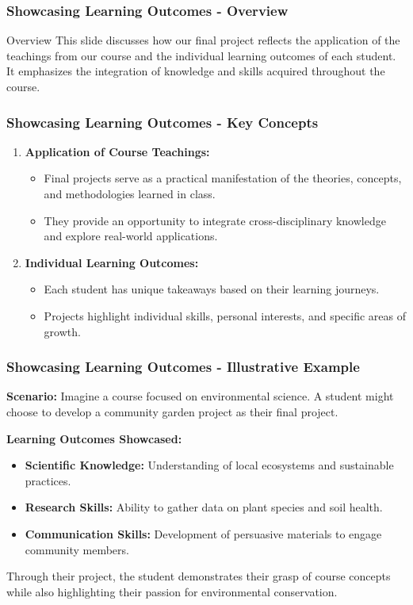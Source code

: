 \documentclass[aspectratio=169]{beamer}
\begin{document}
\begin{frame}[fragile]
    \frametitle{Showcasing Learning Outcomes - Overview}
    \begin{block}{Overview}
        This slide discusses how our final project reflects the application of the teachings from our course and the individual learning outcomes of each student. It emphasizes the integration of knowledge and skills acquired throughout the course.
    \end{block}
\end{frame}

\begin{frame}[fragile]
    \frametitle{Showcasing Learning Outcomes - Key Concepts}
    \begin{enumerate}
        \item \textbf{Application of Course Teachings:}
            \begin{itemize}
                \item Final projects serve as a practical manifestation of the theories, concepts, and methodologies learned in class.
                \item They provide an opportunity to integrate cross-disciplinary knowledge and explore real-world applications.
            \end{itemize}
        
        \item \textbf{Individual Learning Outcomes:}
            \begin{itemize}
                \item Each student has unique takeaways based on their learning journeys.
                \item Projects highlight individual skills, personal interests, and specific areas of growth.
            \end{itemize}
    \end{enumerate}
\end{frame}

\begin{frame}[fragile]
    \frametitle{Showcasing Learning Outcomes - Illustrative Example}
    \textbf{Scenario:} Imagine a course focused on environmental science. A student might choose to develop a community garden project as their final project. 

    \textbf{Learning Outcomes Showcased:}
    \begin{itemize}
        \item \textbf{Scientific Knowledge:} Understanding of local ecosystems and sustainable practices.
        \item \textbf{Research Skills:} Ability to gather data on plant species and soil health.
        \item \textbf{Communication Skills:} Development of persuasive materials to engage community members.
    \end{itemize}
    
    Through their project, the student demonstrates their grasp of course concepts while also highlighting their passion for environmental conservation.
\end{frame}
\end{document}
